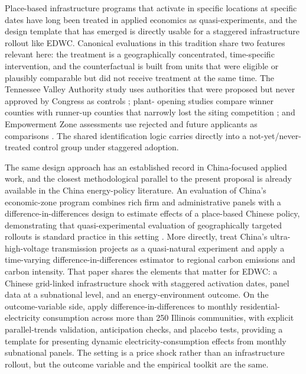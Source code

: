 \documentclass[12pt,a4paper]{article}
\begin{document}
Place-based infrastructure programs that activate in specific
locations at specific dates have long been treated in applied
economics as quasi-experiments, and the design template that has
emerged is directly usable for a staggered infrastructure rollout
like EDWC. Canonical evaluations in this tradition share two features
relevant here: the treatment is a geographically concentrated,
time-specific intervention, and the counterfactual is built from
units that were eligible or plausibly comparable but did not receive
treatment at the same time. The Tennessee Valley Authority study uses
authorities that were proposed but never approved by Congress as
controls \citep{klinemoretti-2014-localeconomicdevelopment}; plant-
opening studies compare winner counties with runner-up counties that
narrowly lost the siting competition
\citep{--identifyingagglomerationspillovers}; and Empowerment Zone
assessments use rejected and future applicants as comparisons
\citep{bussoetal-2013-assessingincidenceefficiency}. The shared
identification logic carries directly into a
not-yet/never-treated control group under staggered adoption.

The same design approach has an established record in
China-focused applied work, and the closest methodological parallel
to the present proposal is already available in the China
energy-policy literature. An evaluation of China's economic-zone
program combines rich firm and administrative panels with a
difference-in-differences design to estimate effects of a
place-based Chinese policy, demonstrating that quasi-experimental
evaluation of geographically targeted rollouts is standard practice
in this setting
\citep{luetal-2019-placebasedpoliciescreation}. More directly,
\citet{wangetal-2023-transregionalelectricitytransmission} treat
China's ultra-high-voltage transmission projects as a quasi-natural
experiment and apply a time-varying difference-in-differences
estimator to regional carbon emissions and carbon intensity. That
paper shares the elements that matter for EDWC: a Chinese grid-linked
infrastructure shock with staggered activation dates, panel data at a
subnational level, and an energy-environment outcome. On the
outcome-variable side, \citet{deryuginaetal-2020-longrundynamicselectricity}
apply difference-in-differences to monthly residential-electricity
consumption across more than 250 Illinois communities, with explicit
parallel-trends validation, anticipation checks, and placebo tests,
providing a template for presenting dynamic electricity-consumption
effects from monthly subnational panels. The setting is a price shock
rather than an infrastructure rollout, but the outcome variable and
the empirical toolkit are the same.
\end{document}
